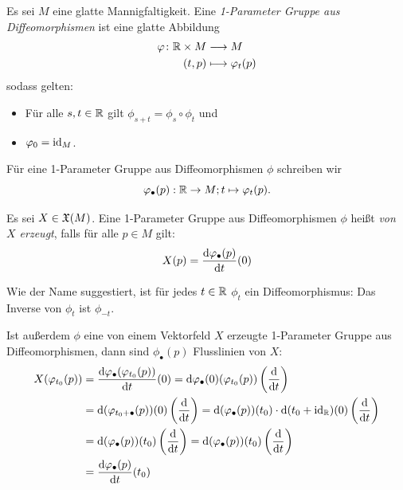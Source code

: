 \begin{definition}
    \label{def: 1-parameter gruppe aus diffeos}
    Es sei $M$ eine glatte Mannigfaltigkeit. Eine 
    \textit{1-Parameter Gruppe aus Diffeomorphismen} ist eine glatte Abbildung
    \begin{align*}
        \varphi \colon { \mathbb R } \times M \longrightarrow & \; M \\
        (t, p) \longmapsto & \; \varphi_t(p)
    \end{align*}
    sodass gelten: 
    \begin{itemize}
        \item Für alle $s, t \in { \mathbb R }$ gilt $\phi_{s + t} = \phi_s \circ \phi_t$ und
        \item $\varphi_0 = { \operatorname{id} }_{M}$.
    \end{itemize}

    Für eine 1-Parameter Gruppe aus Diffeomorphismen $\phi$ schreiben wir 
    \[ \varphi_{\bullet}(p): { \mathbb R } \to M ; t \mapsto \varphi_t(p) . \]

    Es sei $X \in { \mathfrak{X} } (M)$. Eine 1-Parameter Gruppe aus Diffeomorphismen $\phi$ heißt 
    \textit{von $X$ erzeugt}, falls für alle $p \in M$ gilt:
    \[ X(p) = \derive[\phi_{\bullet}(p)]{t}(0) \]
\end{definition}

\begin{remark}
    Wie der Name suggestiert, ist für jedes $t \in { \mathbb R }$ $\phi_t$ ein 
    Diffeomorphismus: Das Inverse von $\phi_t$ ist $\phi_{-t}$.

    Ist außerdem $\phi$ eine von einem Vektorfeld $X$ erzeugte 1-Parameter Gruppe aus 
    Diffeomorphismen, dann sind $\phi_{\bullet}(p)$ Flusslinien von $X$:
    \begin{align*}
        X(\varphi_{t_0}(p)) 
        & = \derive[\varphi_{\bullet}(\varphi_{t_0}(p))]{t}(0)
        = \opd \varphi_{\bullet} (0) (\varphi_{t_0}(p)) \left(\derive{t}\right) \\
        & = \opd (\varphi_{t_0 + \bullet}(p)) (0) \left(\derive{t}\right)
        = \opd (\varphi_{\bullet}(p)) (t_0) \cdot \opd (t_0 + \id_{\R}) (0) \left(\derive{t}\right) \\
        & = \opd (\varphi_{\bullet}(p)) (t_0) \left(\derive{t}\right)
        = \opd (\varphi_{\bullet}(p)) (t_0) \left(\derive{t}\right) \\
        & = \derive[\varphi_{\bullet}(p)]{t}(t_0)
    \end{align*}
\end{remark}

